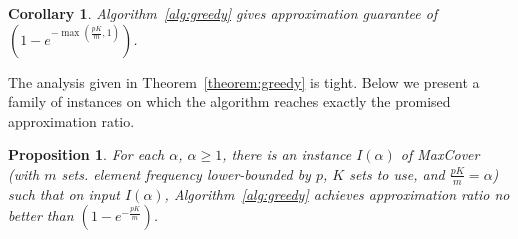 \documentclass[11pt]{article}
\newtheorem{corollary}[theorem]{Corollary}
\newtheorem{proposition}[theorem]{Proposition}
\begin{document}
\begin{corollary}
Algorithm~\ref{alg:greedy} gives approximation guarantee of $(1 - e^{-\max(\frac{pK}{m}, 1)})$.
\end{corollary}

The analysis given in Theorem~\ref{theorem:greedy} is tight. Below we
present a family of instances on which the algorithm reaches exactly
the promised approximation ratio.

\begin{proposition}
  For each $\alpha$, $\alpha \geq 1$, there is an instance $I(\alpha)$
  of MaxCover (with $m$ sets. element frequency lower-bounded by $p$,
  $K$ sets to use, and $\frac{pK}{m} = \alpha$) such that on input
  $I(\alpha)$, Algorithm~\ref{alg:greedy} achieves approximation ratio
  no better than $(1 - e^{-\frac{pK}{m}})$.
\end{proposition}
\end{document}
